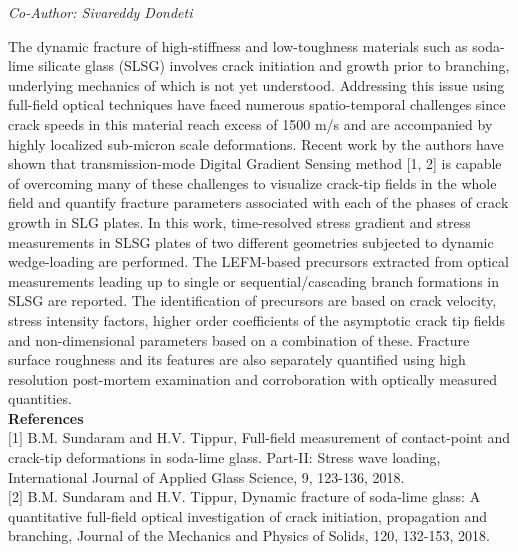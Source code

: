 \begin{center}
\textit{Co-Author: Sivareddy Dondeti}
\end{center} 
The dynamic fracture of high-stiffness and low-toughness materials such as soda-lime silicate glass (SLSG) involves crack initiation and growth prior to branching, underlying mechanics of which is not yet understood. Addressing this issue using full-field optical techniques have faced numerous spatio-temporal challenges since crack speeds in this material reach excess of 1500 m/s and are accompanied by highly localized sub-micron scale deformations. Recent work by the authors have shown that transmission-mode Digital Gradient Sensing method [1, 2] is capable of overcoming many of these challenges to visualize crack-tip fields in the whole field and quantify fracture parameters associated with each of the phases of crack growth in SLG plates. In this work, time-resolved stress gradient and stress measurements in SLSG plates of two different geometries subjected to dynamic wedge-loading are performed. The LEFM-based precursors extracted from optical measurements leading up to single or sequential/cascading branch formations in SLSG are reported. The identification of precursors are based on crack velocity, stress intensity factors, higher order coefficients of the asymptotic crack tip fields and non-dimensional parameters based on a combination of these. Fracture surface roughness and its features are also separately quantified using high resolution post-mortem examination and corroboration with optically measured quantities.\\

\noindent\textbf{References}\\
$[$1$]$ B.M. Sundaram and H.V. Tippur, Full-field measurement of contact-point and crack-tip deformations in soda-lime glass. Part-II: Stress wave loading, International Journal of Applied Glass Science, 9, 123-136, 2018.\\\newline 
$[$2$]$ B.M. Sundaram and H.V. Tippur, Dynamic fracture of soda-lime glass: A quantitative full-field optical investigation of crack initiation, propagation and branching, Journal of the Mechanics and Physics of Solids, 120, 132-153, 2018. 
